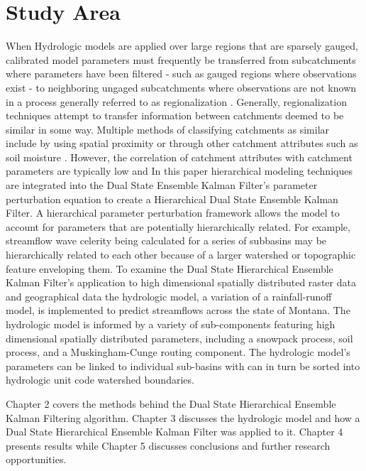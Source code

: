 \section{Study Area}		
	When Hydrologic models are applied over large regions that are sparsely gauged, calibrated model parameters must frequently be transferred from subcatchments where parameters have been filtered - such as gauged regions where observations exist - to neighboring ungaged subcatchments where observations are not known in a process generally referred to as regionalization \cite{Bloschl1995}. Generally, regionalization techniques attempt to transfer information between catchments deemed to be similar in some way. Multiple methods of classifying catchments as similar include by using spatial proximity \cite{Julier1997} or through other catchment attributes such as soil moisture \cite{Peel2000}. However, the correlation of catchment attributes with catchment parameters are typically low \cite{Bardossy2007} and 
	In this paper hierarchical modeling techniques are integrated into the Dual State Ensemble Kalman Filter's parameter perturbation equation to create a Hierarchical Dual State Ensemble Kalman Filter. A hierarchical parameter perturbation framework allows the model to account for parameters that are potentially hierarchically related. For example, streamflow wave celerity being calculated for a series of subbasins may be hierarchically related to each other because of a larger watershed or topographic feature enveloping them. To examine the Dual State Hierarchical Ensemble Kalman Filter's application to high dimensional spatially distributed raster data and geographical data the hydrologic model, a variation of a rainfall-runoff model, is implemented to predict streamflows across the state of Montana. The hydrologic model is informed by a variety of sub-components featuring high dimensional spatially distributed parameters, including a snowpack process, soil process, and a Muskingham-Cunge routing component. The hydrologic model's parameters can be linked to individual sub-basins with can in turn be sorted into hydrologic unit code watershed boundaries.
	
	Chapter 2 covers the methods behind the Dual State Hierarchical Ensemble Kalman Filtering algorithm. Chapter 3 discusses the hydrologic model and how a Dual State Hierarchical Ensemble Kalman Filter was applied to it. Chapter 4 presents results while Chapter 5 discusses conclusions and further research opportunities.
	
	